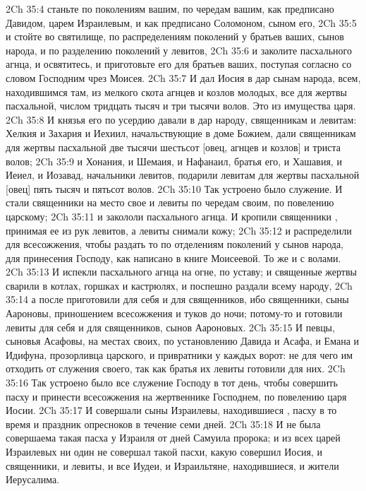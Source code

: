 \vs 2Ch 35:4 станьте по поколениям вашим, по чередам вашим, как предписано Давидом, царем Израилевым, и как предписано Соломоном, сыном его,
\vs 2Ch 35:5 и стойте во святилище, по распределениям поколений у братьев ваших, сынов народа, и по разделению поколений у левитов,
\vs 2Ch 35:6 и заколите пасхального агнца, и освятитесь, и приготовьте его для братьев ваших, поступая согласно со словом Господним чрез Моисея.
\vs 2Ch 35:7 И дал Иосия в дар сынам народа, всем, находившимся там, из мелкого скота агнцев и козлов молодых, все для жертвы пасхальной, числом тридцать тысяч и три тысячи волов. Это из имущества царя.
\vs 2Ch 35:8 И князья его по усердию давали в дар народу, священникам и левитам: Хелкия и Захария и Иехиил, начальствующие в доме Божием, дали священникам для жертвы пасхальной две тысячи шестьсот [овец, агнцев и козлов] и триста волов;
\vs 2Ch 35:9 и Хонания, и Шемаия, и Нафанаил, братья его, и Хашавия, и Иеиел, и Иозавад, начальники левитов, подарили левитам для жертвы пасхальной [овец] пять тысяч и пятьсот волов.
\rsbpar\vs 2Ch 35:10 Так устроено было служение. И стали священники на место свое и левиты по чередам своим, по повелению царскому;
\vs 2Ch 35:11 и закололи пасхального агнца. И кропили священники , принимая ее из рук левитов, а левиты снимали кожу;
\vs 2Ch 35:12 и распределили  для всесожжения, чтобы раздать то по отделениям поколений у сынов народа, для принесения Господу, как написано в книге Моисеевой. То же  и с волами.
\vs 2Ch 35:13 И испекли пасхального агнца на огне, по уставу; и священные жертвы сварили в котлах, горшках и кастрюлях, и поспешно раздали всему народу,
\vs 2Ch 35:14 а после приготовили для себя и для священников, ибо священники, сыны Аароновы,  приношением всесожжения и туков до ночи; потому-то и готовили левиты для себя и для священников, сынов Аароновых.
\vs 2Ch 35:15 И певцы, сыновья Асафовы,  на местах своих, по установлению Давида и Асафа, и Емана и Идифуна, прозорливца царского, и привратники у каждых ворот: не для чего  им отходить от служения своего, так как братья их левиты готовили для них.
\vs 2Ch 35:16 Так устроено было все служение Господу в тот день, чтобы совершить пасху и принести всесожжения на жертвеннике Господнем, по повелению царя Иосии.
\vs 2Ch 35:17 И совершали сыны Израилевы, находившиеся , пасху в то время и праздник опресноков в течение семи дней.
\vs 2Ch 35:18 И не была совершаема такая пасха у Израиля от дней Самуила пророка; и из всех царей Израилевых ни один не совершал такой пасхи, какую совершил Иосия, и священники, и левиты, и все Иудеи, и Израильтяне,  находившиеся, и жители Иерусалима.

